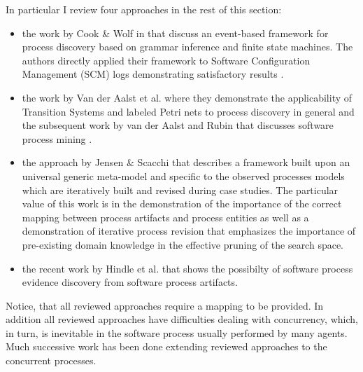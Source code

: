 In particular I review four approaches in the rest of this section: 
\begin{itemize}
 \item the work by Cook \& Wolf in that discuss an event-based framework for process discovery based on grammar 
  inference and finite state machines. 
  The authors directly applied their framework to Software Configuration Management (SCM) logs demonstrating satisfactory 
  results \cite{citeulike:328044}.
 \item the work by Van der Aalst et al. where they demonstrate the applicability of Transition Systems and labeled Petri nets 
  to process discovery in general \cite{citeulike:3718014} and the subsequent work by van der Aalst and Rubin 
  that discusses software process mining \cite{citeulike:1885717}.
 \item the approach by Jensen \& Scacchi \cite{citeulike:5043664} that describes a framework built upon an universal generic 
  meta-model and specific to the observed processes models which are iteratively built and revised during case studies. 
  The particular value of this work is in the demonstration of the importance of the correct mapping between process artifacts 
  and process entities as well as a demonstration of iterative process revision that emphasizes the importance of pre-existing 
  domain knowledge in the effective pruning of the search space.
\item the recent work by Hindle et al. \cite{citeulike:9114115} \cite{citeulike:9007622} that shows the possibilty of software 
  process evidence discovery from software process artifacts.
\end{itemize}

Notice, that all reviewed approaches require a mapping to be provided. In addition all reviewed approaches have difficulties 
dealing with concurrency, which, in turn, is inevitable in the software process usually performed by many agents. 
Much successive work has been done extending reviewed approaches to the concurrent processes. 

